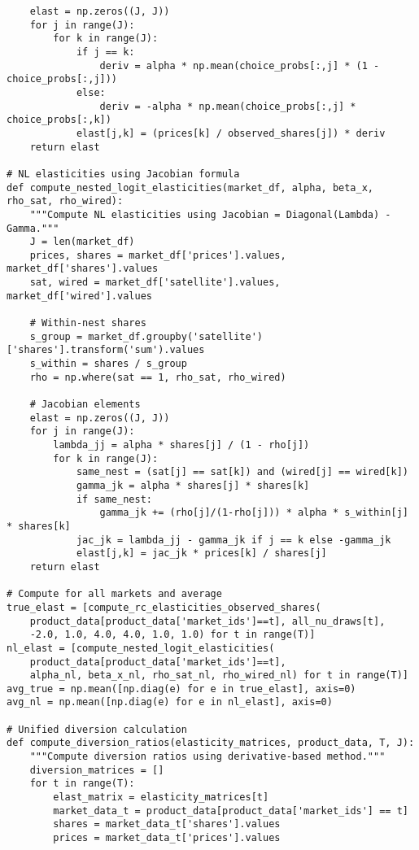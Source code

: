 \documentclass[english,11pt]{article}
\begin{document}
\begin{enumerate}
\begin{verbatim}
    elast = np.zeros((J, J))
    for j in range(J):
        for k in range(J):
            if j == k:
                deriv = alpha * np.mean(choice_probs[:,j] * (1 - choice_probs[:,j]))
            else:
                deriv = -alpha * np.mean(choice_probs[:,j] * choice_probs[:,k])
            elast[j,k] = (prices[k] / observed_shares[j]) * deriv
    return elast

# NL elasticities using Jacobian formula
def compute_nested_logit_elasticities(market_df, alpha, beta_x, rho_sat, rho_wired):
    """Compute NL elasticities using Jacobian = Diagonal(Lambda) - Gamma."""
    J = len(market_df)
    prices, shares = market_df['prices'].values, market_df['shares'].values
    sat, wired = market_df['satellite'].values, market_df['wired'].values
    
    # Within-nest shares
    s_group = market_df.groupby('satellite')['shares'].transform('sum').values
    s_within = shares / s_group
    rho = np.where(sat == 1, rho_sat, rho_wired)
    
    # Jacobian elements
    elast = np.zeros((J, J))
    for j in range(J):
        lambda_jj = alpha * shares[j] / (1 - rho[j])
        for k in range(J):
            same_nest = (sat[j] == sat[k]) and (wired[j] == wired[k])
            gamma_jk = alpha * shares[j] * shares[k]
            if same_nest:
                gamma_jk += (rho[j]/(1-rho[j])) * alpha * s_within[j] * shares[k]
            jac_jk = lambda_jj - gamma_jk if j == k else -gamma_jk
            elast[j,k] = jac_jk * prices[k] / shares[j]
    return elast

# Compute for all markets and average
true_elast = [compute_rc_elasticities_observed_shares(
    product_data[product_data['market_ids']==t], all_nu_draws[t], 
    -2.0, 1.0, 4.0, 4.0, 1.0, 1.0) for t in range(T)]
nl_elast = [compute_nested_logit_elasticities(
    product_data[product_data['market_ids']==t], 
    alpha_nl, beta_x_nl, rho_sat_nl, rho_wired_nl) for t in range(T)]
avg_true = np.mean([np.diag(e) for e in true_elast], axis=0)
avg_nl = np.mean([np.diag(e) for e in nl_elast], axis=0)

# Unified diversion calculation
def compute_diversion_ratios(elasticity_matrices, product_data, T, J):
    """Compute diversion ratios using derivative-based method."""
    diversion_matrices = []
    for t in range(T):
        elast_matrix = elasticity_matrices[t]
        market_data_t = product_data[product_data['market_ids'] == t]
        shares = market_data_t['shares'].values
        prices = market_data_t['prices'].values
        

\end{verbatim}
\end{enumerate}
\end{document}
